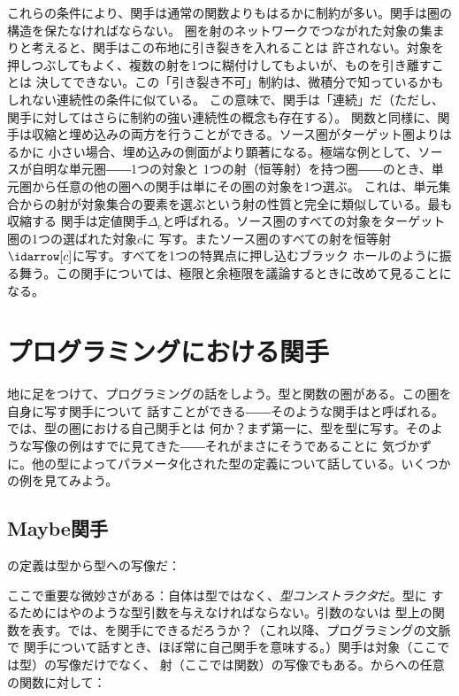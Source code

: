 \noindent
これらの条件により、関手は通常の関数よりもはるかに制約が多い。関手は圏の構造を保たなければならない。
圏を射のネットワークでつながれた対象の集まりと考えると、関手はこの布地に引き裂きを入れることは
許されない。対象を押しつぶしてもよく、複数の射を1つに糊付けしてもよいが、ものを引き離すことは
決してできない。この「引き裂き不可」制約は、微積分で知っているかもしれない連続性の条件に似ている。
この意味で、関手は「連続」だ（ただし、関手に対してはさらに制約の強い連続性の概念も存在する）。
関数と同様に、関手は収縮と埋め込みの両方を行うことができる。ソース圏がターゲット圏よりはるかに
小さい場合、埋め込みの側面がより顕著になる。極端な例として、ソースが自明な単元圏――1つの対象と
1つの射（恒等射）を持つ圏――のとき、単元圏から任意の他の圏への関手は単にその圏の対象を1つ選ぶ。
これは、単元集合からの射が対象集合の要素を選ぶという射の性質と完全に類似している。最も収縮する
関手は定値関手$\Delta_c$と呼ばれる。ソース圏のすべての対象をターゲット圏の1つの選ばれた対象$c$に
写す。またソース圏のすべての射を恒等射$\idarrow[c]$に写す。すべてを1つの特異点に押し込むブラック
ホールのように振る舞う。この関手については、極限と余極限を議論するときに改めて見ることになる。

\section{プログラミングにおける関手}

地に足をつけて、プログラミングの話をしよう。型と関数の圏がある。この圏を自身に写す関手について
話すことができる――そのような関手はと呼ばれる。では、型の圏における自己関手とは
何か？まず第一に、型を型に写す。そのような写像の例はすでに見てきた――それがまさにそうであることに
気づかずに。他の型によってパラメータ化された型の定義について話している。いくつかの例を見てみよう。

\subsection{Maybe関手}

の定義は型から型への写像だ：

ここで重要な微妙さがある：自体は型ではなく、\emph{型コンストラクタ}だ。型に
するためにはやのような型引数を与えなければならない。引数のないは
型上の関数を表す。では、を関手にできるだろうか？（これ以降、プログラミングの文脈で
関手について話すとき、ほぼ常に自己関手を意味する。）関手は対象（ここでは型）の写像だけでなく、
射（ここでは関数）の写像でもある。からへの任意の関数に対して：

